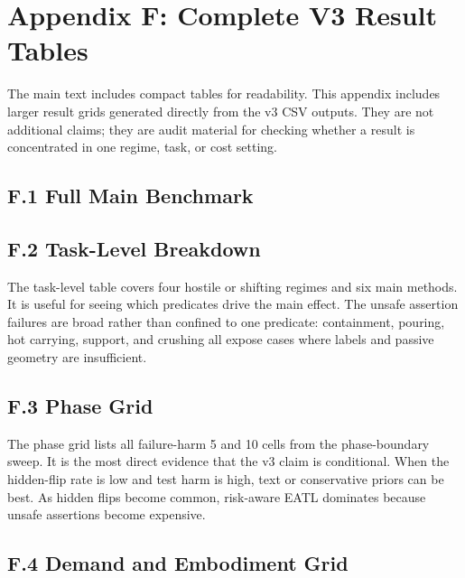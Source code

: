 \documentclass{article}
\begin{document}
\section{Appendix F: Complete V3 Result Tables}

The main text includes compact tables for readability.  This appendix includes
larger result grids generated directly from the v3 CSV outputs.  They are not
additional claims; they are audit material for checking whether a result is
concentrated in one regime, task, or cost setting.

\subsection{F.1 Full Main Benchmark}

\begingroup
\scriptsize

\endgroup

\subsection{F.2 Task-Level Breakdown}

The task-level table covers four hostile or shifting regimes and six main
methods.  It is useful for seeing which predicates drive the main effect.  The
unsafe assertion failures are broad rather than confined to one predicate:
containment, pouring, hot carrying, support, and crushing all expose cases where
labels and passive geometry are insufficient.

\begingroup
\tiny

\endgroup

\subsection{F.3 Phase Grid}

The phase grid lists all failure-harm 5 and 10 cells from the phase-boundary
sweep.  It is the most direct evidence that the v3 claim is conditional.  When
the hidden-flip rate is low and test harm is high, text or conservative priors
can be best.  As hidden flips become common, risk-aware EATL dominates because
unsafe assertions become expensive.

\begingroup
\scriptsize

\endgroup

\subsection{F.4 Demand and Embodiment Grid}
\end{document}
